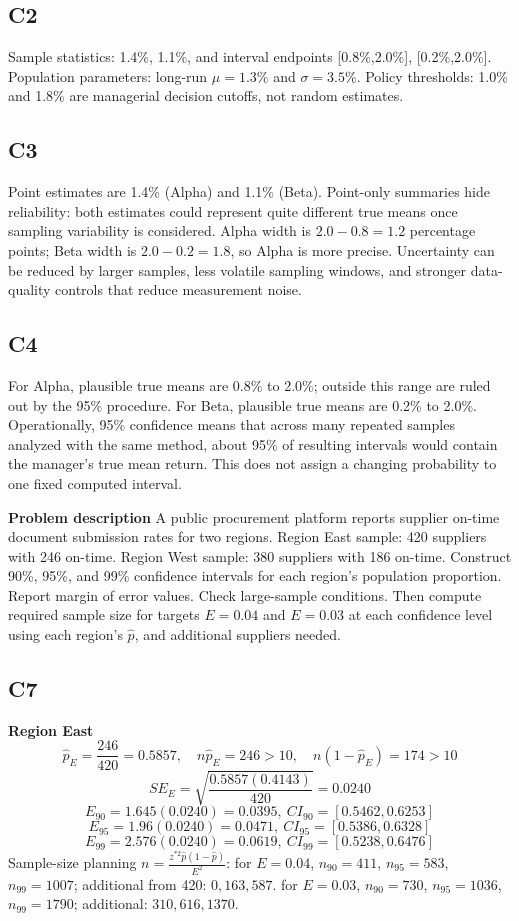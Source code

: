 \begin{ExamProblems}
		\subsection*{C2}
		Sample statistics: 1.4\%, 1.1\%, and interval endpoints [0.8\%,2.0\%], [0.2\%,2.0\%].
		Population parameters: long-run $\mu=1.3\%$ and $\sigma=3.5\%$.
		Policy thresholds: 1.0\% and 1.8\% are managerial decision cutoffs, not random estimates.
		
		\subsection*{C3}
		Point estimates are 1.4\% (Alpha) and 1.1\% (Beta).
		Point-only summaries hide reliability: both estimates could represent quite different true means once sampling variability is considered.
		Alpha width is $2.0-0.8=1.2$ percentage points; Beta width is $2.0-0.2=1.8$, so Alpha is more precise.
		Uncertainty can be reduced by larger samples, less volatile sampling windows, and stronger data-quality controls that reduce measurement noise.
		
		\subsection*{C4}
		For Alpha, plausible true means are 0.8\% to 2.0\%; outside this range are ruled out by the 95\% procedure.
		For Beta, plausible true means are 0.2\% to 2.0\%.
		Operationally, 95\% confidence means that across many repeated samples analyzed with the same method, about 95\% of resulting intervals would contain the manager's true mean return.
		This does not assign a changing probability to one fixed computed interval.

		\newpage
		\item
		\textbf{Problem description}
		A public procurement platform reports supplier on-time document submission rates for two regions.
		Region East sample: 420 suppliers with 246 on-time.
		Region West sample: 380 suppliers with 186 on-time.
		Construct 90\%, 95\%, and 99\% confidence intervals for each region's population proportion.
		Report margin of error values.
		Check large-sample conditions.
		Then compute required sample size for targets $E=0.04$ and $E=0.03$ at each confidence level using each region's $\hat{p}$, and additional suppliers needed.
		
		\subsection*{C7}
		\textbf{Region East}
		\[
		\hat{p}_E=\frac{246}{420}=0.5857,
		\quad n\hat{p}_E=246>10,
		\quad n(1-\hat{p}_E)=174>10
		\]
		\[
		SE_E=\sqrt{\frac{0.5857(0.4143)}{420}}=0.0240
		\]
		\[
		E_{90}=1.645(0.0240)=0.0395,\ CI_{90}=[0.5462,0.6253]
		\]
		\[
		E_{95}=1.96(0.0240)=0.0471,\ CI_{95}=[0.5386,0.6328]
		\]
		\[
		E_{99}=2.576(0.0240)=0.0619,\ CI_{99}=[0.5238,0.6476]
		\]
		Sample-size planning $n=\frac{z^{*2}\hat{p}(1-\hat{p})}{E^2}$:
		for $E=0.04$, $n_{90}=411$, $n_{95}=583$, $n_{99}=1007$;
		additional from 420: $0,163,587$.
		for $E=0.03$, $n_{90}=730$, $n_{95}=1036$, $n_{99}=1790$;
		additional: $310,616,1370$.
		

\end{ExamProblems}
